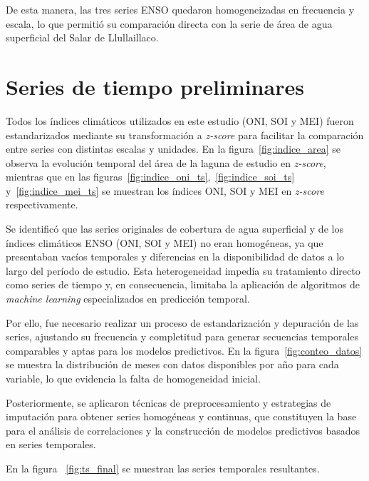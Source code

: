 De esta manera, las tres series ENSO quedaron homogeneizadas en frecuencia y escala, lo que permitió su comparación directa con la serie de área de agua superficial del Salar de Llullaillaco.




\section{Series de tiempo preliminares}

Todos los índices climáticos utilizados en este estudio (ONI, SOI y MEI) fueron estandarizados mediante su transformación a \textit{z-score} para facilitar la comparación entre series con distintas escalas y unidades. En la figura~\ref{fig:indice_area} se observa la evolución temporal del área de la laguna de estudio en \textit{z-score}, mientras que en las figuras~\ref{fig:indice_oni_ts},~\ref{fig:indice_soi_ts} y~\ref{fig:indice_mei_ts} se muestran los índices ONI, SOI y MEI en \textit{z-score} respectivamente.

Se identificó que las series originales de cobertura de agua superficial y de los índices climáticos ENSO (ONI, SOI y MEI) no eran homogéneas, ya que presentaban vacíos temporales y diferencias en la disponibilidad de datos a lo largo del período de estudio. Esta heterogeneidad impedía su tratamiento directo como series de tiempo y, en consecuencia, limitaba la aplicación de algoritmos de \textit{machine learning} especializados en predicción temporal.  

Por ello, fue necesario realizar un proceso de estandarización y depuración de las series, ajustando su frecuencia y completitud para generar secuencias temporales comparables y aptas para los modelos predictivos. En la figura~\ref{fig:conteo_datos} se muestra la distribución de meses con datos disponibles por año para cada variable, lo que evidencia la falta de homogeneidad inicial. 

Posteriormente, se aplicaron técnicas de preprocesamiento y estrategias de imputación para obtener series homogéneas y continuas, que constituyen la base para el análisis de correlaciones y la construcción de modelos predictivos basados en series temporales.  

En la figura ~\ref{fig:ts_final} se muestran las series temporales resultantes.


